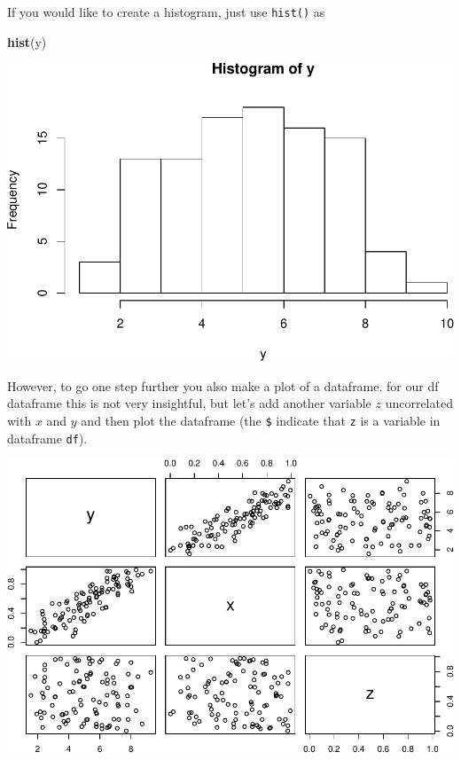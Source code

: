 \documentclass[]{article}
\newenvironment{Shaded}{\begin{snugshade}}{\end{snugshade}}
\newcommand{\KeywordTok}[1]{\textcolor[rgb]{0.13,0.29,0.53}{\textbf{{#1}}}}
\newcommand{\DecValTok}[1]{\textcolor[rgb]{0.00,0.00,0.81}{{#1}}}
\newcommand{\StringTok}[1]{\textcolor[rgb]{0.31,0.60,0.02}{{#1}}}
\newcommand{\NormalTok}[1]{{#1}}
\theoremstyle{definition}
\theoremstyle{definition}
\theoremstyle{definition}
\theoremstyle{remark}
\begin{document}
If you would like to create a histogram, just use \texttt{hist()} as

\begin{Shaded}
\begin{Highlighting}[]
\KeywordTok{hist}\NormalTok{(y)}
\end{Highlighting}
\end{Shaded}

\includegraphics{./unnamed-chunk-28-1.pdf}

However, to go one step further you also make a plot of a dataframe. for
our df dataframe this is not very insightful, but let's add another
variable \(z\) uncorrelated with \(x\) and \(y\) and then plot the
dataframe (the \texttt{\$} indicate that \texttt{z} is a variable in
dataframe \texttt{df}).

\begin{Shaded}
\end{Shaded}

\includegraphics{./unnamed-chunk-29-1.pdf}
\end{document}

